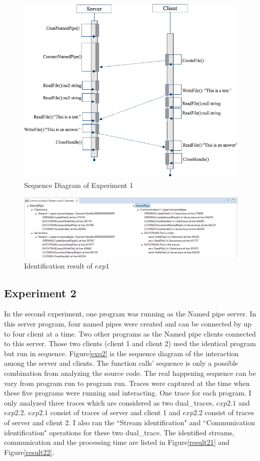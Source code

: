 \begin{figure}[H]
\centerline{\includegraphics[scale=0.7]{Figures/exp1}}
 \caption{Sequence Diagram of Experiment 1}
\label{exp1}
\end{figure}

\begin{figure}[H]
\centerline{\includegraphics[scale=0.6]{Figures/result1}}
 \caption{Identification result of $exp1$}
\label{result1}
\end{figure}

\subsection{Experiment 2}
In the second experiment, one program was running as the Named pipe server. In this server program, four named pipes were created and can be connected by up to four client at a time. Two other programs as the Named pipe clients connected to this server. Those two clients (client 1 and client 2) used the identical program but run in sequence. Figure\ref{exp2} is the sequence diagram of  the interaction among the server and clients. The function calls' sequence is only a possible combination from analyzing the source code. The real happening sequence can be vary from program run to program run. Traces were captured at the time when these five programs were running and interacting. One trace for each program. I only analyzed  three traces which are considered as two dual\_traces, $exp2.1$ and $exp2.2$. $exp2.1$ consist of traces of server and client 1 and $exp2.2$ consist of traces of server and client 2. I also ran the ``Stream identification" and ``Communication identification" operations for these two dual\_trace. The identified streams, communication and the processing time are listed in Figure\ref{result21} and Figure\ref{result22}.

